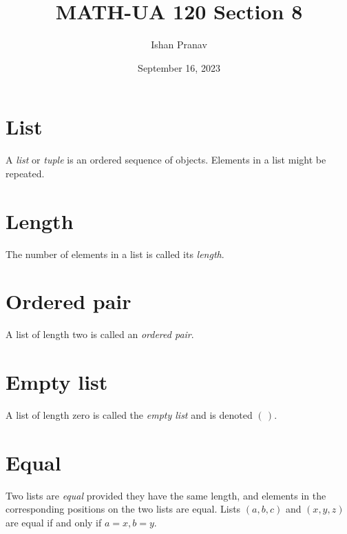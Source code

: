 \documentclass[12pt]{article}
\title{MATH-UA 120 Section 8}
\author{Ishan Pranav}
\date{September 16, 2023}
\begin{document}
\maketitle
\section*{List}
A \textit{list} or \textit{tuple} is an ordered sequence of objects. Elements in a list might be repeated.
\section*{Length}
The number of elements in a list is called its \textit{length}.
\section*{Ordered pair}
A list of length two is called an \textit{ordered pair}.
\section*{Empty list}
A list of length zero is called the \textit{empty list} and is denoted $(\,)$.
\section*{Equal}
Two lists are \textit{equal} provided they have the same length, and elements in the corresponding positions on the two lists are equal. Lists $(a,b,c)$ and $(x,y,z)$ are equal if and only if $a=x,b=y$.
\end{document}
